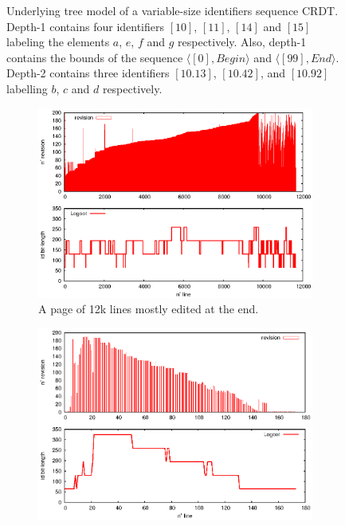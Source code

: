 \begin{figure}[h]
\begin{center}

\caption{Underlying tree model of a variable-size identifiers sequence CRDT.
  Depth-1 contains four identifiers $[10]$, $[11]$, $[14]$ and $[15]$ labeling
  the elements $a$, $e$, $f$ and $g$ respectively. Also, depth-1 contains the
  bounds of the sequence $\langle [0], Begin \rangle$ and $\langle [99],End
  \rangle$. Depth-2 contains three identifiers $[10.13]$, $[10.42]$, and
  $[10.92]$ labelling $b$, $c$ and $d$ respectively.  }
\label{fig:treeexample}
\end{center}
\end{figure}


\begin{figure}
\begin{subfigure}[t]{0.47\textwidth}
  \includegraphics[width=\textwidth]{img/compliant.eps}
  \caption{A page of 12k lines mostly edited at
    the end.}
  \label{im:posteonlyblue}
\end{subfigure}
\hfill
\begin{subfigure}[t]{0.47\textwidth}
\includegraphics[width=\textwidth]{img/motivating.eps}

\end{subfigure}
\end{figure}
